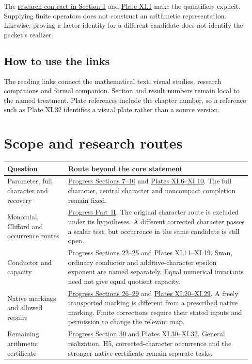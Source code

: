 The \href{https://komorebi.invalid/b07/contract}{research contract in Section 1} and \href{https://komorebi.invalid/b07/contract_atlas}{Plate XI.1} make the quantifiers explicit. Supplying finite operators does not construct an arithmetic representation. Likewise, proving a factor identity for a different candidate does not identify the packet's realizer.

\subsection*{How to use the links}
The reading links connect the mathematical text, visual studies, research companions and formal companion. Section and result numbers remain local to the named treatment. Plate references include the chapter number, so a reference such as Plate XI.32 identifies a visual plate rather than a source version.
\clearpage
\section*{Scope and research routes}
{}
\begin{tabular}{@{}>{\raggedright\arraybackslash}p{.32\linewidth}>{\raggedright\arraybackslash}p{.63\linewidth}@{}}\toprule
Question & Route beyond the core statement\\\midrule
Parameter, full character and recovery & \href{https://komorebi.invalid/b07/arithmetic}{Progress Sections 7--10} and \href{https://komorebi.invalid/b07/arithmetic_atlas}{Plates XI.6--XI.10}. The full character, central character and noncompact completion remain fixed.\\[8pt]
Monomial, Clifford and occurrence routes & \href{https://komorebi.invalid/b07/monomial}{Progress Part II}. The original character route is excluded under its hypotheses. A different corrected character passes a scalar test, but occurrence in the same candidate is still open.\\[8pt]
Conductor and capacity & \href{https://komorebi.invalid/b07/conductor}{Progress Sections 22--25} and \href{https://komorebi.invalid/b07/conductor_atlas}{Plates XI.11--XI.19}. Swan, ordinary conductor and additive-character epsilon exponent are named separately. Equal numerical invariants need not give equal quotient capacity.\\[8pt]
Native markings and allowed repairs & \href{https://komorebi.invalid/b07/markings}{Progress Sections 26--29} and \href{https://komorebi.invalid/b07/markings_atlas}{Plates XI.20--XI.29}. A freely transported marking is different from a prescribed native marking. Finite corrections require their stated inputs and permission to change the relevant map.\\[8pt]
Remaining arithmetic certificate & \href{https://komorebi.invalid/b07/remaining}{Progress Section 30} and \href{https://komorebi.invalid/b07/remaining_atlas}{Plates XI.30--XI.32}. General realization, H5, corrected-character occurrence and the stronger native certificate remain separate tasks.\\\bottomrule
\end{tabular}

